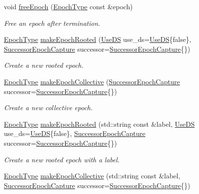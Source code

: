 \begin{DoxyCompactItemize}
void \hyperlink{structvt_1_1term_1_1_termination_detector_a3b1e4a0d87c5af08fc36925ec74504fd}{free\+Epoch} (\hyperlink{namespacevt_a985a5adf291c34a3ca263b3378388236}{Epoch\+Type} const \&epoch)
\begin{DoxyCompactList}\small\item\em Free an epoch after termination. \end{DoxyCompactList}\item 
\hyperlink{namespacevt_a985a5adf291c34a3ca263b3378388236}{Epoch\+Type} \hyperlink{structvt_1_1term_1_1_termination_detector_ab0724773b4856bfe8225bc5bc0ca6ec0}{make\+Epoch\+Rooted} (\hyperlink{structvt_1_1term_1_1_use_d_s}{Use\+DS} use\+\_\+ds=\hyperlink{structvt_1_1term_1_1_use_d_s}{Use\+DS}\{false\}, \hyperlink{structvt_1_1term_1_1_successor_epoch_capture}{Successor\+Epoch\+Capture} successor=\hyperlink{structvt_1_1term_1_1_successor_epoch_capture}{Successor\+Epoch\+Capture}\{\})
\begin{DoxyCompactList}\small\item\em Create a new rooted epoch. \end{DoxyCompactList}\item 
\hyperlink{namespacevt_a985a5adf291c34a3ca263b3378388236}{Epoch\+Type} \hyperlink{structvt_1_1term_1_1_termination_detector_a748dfa37925107b37bde702e6c5f4aa4}{make\+Epoch\+Collective} (\hyperlink{structvt_1_1term_1_1_successor_epoch_capture}{Successor\+Epoch\+Capture} successor=\hyperlink{structvt_1_1term_1_1_successor_epoch_capture}{Successor\+Epoch\+Capture}\{\})
\begin{DoxyCompactList}\small\item\em Create a new collective epoch. \end{DoxyCompactList}\item 
\hyperlink{namespacevt_a985a5adf291c34a3ca263b3378388236}{Epoch\+Type} \hyperlink{structvt_1_1term_1_1_termination_detector_ab40facc51a93c0c1612d9858f708d697}{make\+Epoch\+Rooted} (std\+::string const \&label, \hyperlink{structvt_1_1term_1_1_use_d_s}{Use\+DS} use\+\_\+ds=\hyperlink{structvt_1_1term_1_1_use_d_s}{Use\+DS}\{false\}, \hyperlink{structvt_1_1term_1_1_successor_epoch_capture}{Successor\+Epoch\+Capture} successor=\hyperlink{structvt_1_1term_1_1_successor_epoch_capture}{Successor\+Epoch\+Capture}\{\})
\begin{DoxyCompactList}\small\item\em Create a new rooted epoch with a label. \end{DoxyCompactList}\item 
\hyperlink{namespacevt_a985a5adf291c34a3ca263b3378388236}{Epoch\+Type} \hyperlink{structvt_1_1term_1_1_termination_detector_a67f24233f3d3e02ca7c1d6dc94e343c9}{make\+Epoch\+Collective} (std\+::string const \&label, \hyperlink{structvt_1_1term_1_1_successor_epoch_capture}{Successor\+Epoch\+Capture} successor=\hyperlink{structvt_1_1term_1_1_successor_epoch_capture}{Successor\+Epoch\+Capture}\{\})

\end{DoxyCompactItemize}
